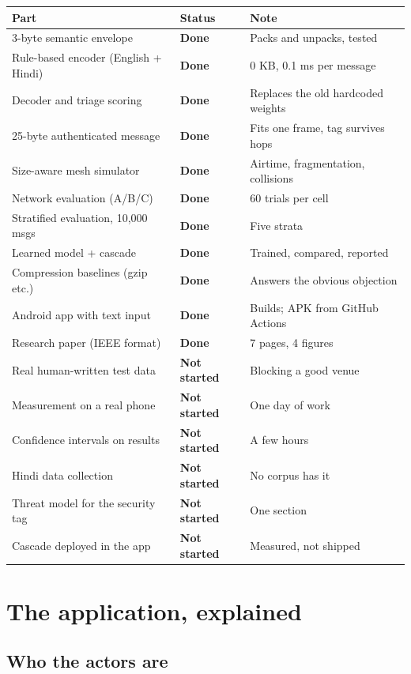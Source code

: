 \documentclass[11pt,a4paper]{article}
\newcommand{\done}{\textcolor{good}{\textbf{Done}}}
\newcommand{\todo}{\textcolor{bad}{\textbf{Not started}}}
\begin{document}
\begin{center}
\begin{longtable}{p{6.3cm} l p{5.5cm}}
\toprule
\textbf{Part} & \textbf{Status} & \textbf{Note} \\
\midrule
\endhead
3-byte semantic envelope & \done & Packs and unpacks, tested \\
Rule-based encoder (English + Hindi) & \done & 0 KB, 0.1 ms per message \\
Decoder and triage scoring & \done & Replaces the old hardcoded weights \\
25-byte authenticated message & \done & Fits one frame, tag survives hops \\
Size-aware mesh simulator & \done & Airtime, fragmentation, collisions \\
Network evaluation (A/B/C) & \done & 60 trials per cell \\
Stratified evaluation, 10{,}000 msgs & \done & Five strata \\
Learned model + cascade & \done & Trained, compared, reported \\
Compression baselines (gzip etc.) & \done & Answers the obvious objection \\
Android app with text input & \done & Builds; APK from GitHub Actions \\
Research paper (IEEE format) & \done & 7 pages, 4 figures \\
\midrule
Real human-written test data & \todo & Blocking a good venue \\
Measurement on a real phone & \todo & One day of work \\
Confidence intervals on results & \todo & A few hours \\
Hindi data collection & \todo & No corpus has it \\
Threat model for the security tag & \todo & One section \\
Cascade deployed in the app & \todo & Measured, not shipped \\
\bottomrule
\end{longtable}
\end{center}

\section{The application, explained}

\subsection{Who the actors are}
\end{document}
